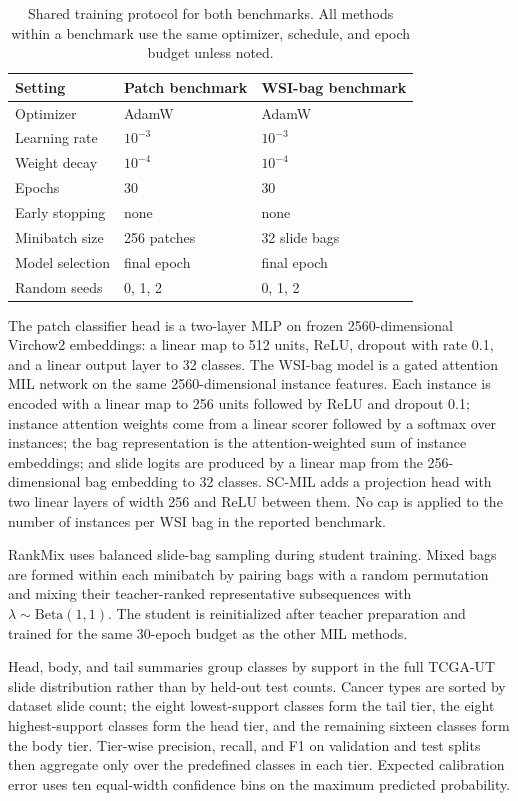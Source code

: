 \documentclass[11pt]{article}
\begin{document}
\begin{table}[ht]
  \centering
  \caption{Shared training protocol for both benchmarks. All methods within a benchmark use the same optimizer, schedule, and epoch budget unless noted.}
  \label{tab:training-protocol}
  \small
  \begin{tabular}{lll}
    \toprule
    Setting & Patch benchmark & WSI-bag benchmark\\
    \midrule
    Optimizer & AdamW & AdamW\\
    Learning rate & $10^{-3}$ & $10^{-3}$\\
    Weight decay & $10^{-4}$ & $10^{-4}$\\
    Epochs & 30 & 30\\
    Early stopping & none & none\\
    Minibatch size & 256 patches & 32 slide bags\\
    Model selection & final epoch & final epoch\\
    Random seeds & 0, 1, 2 & 0, 1, 2\\
    \bottomrule
  \end{tabular}
\end{table}

The patch classifier head is a two-layer MLP on frozen 2560-dimensional Virchow2 embeddings: a linear map to 512 units, ReLU, dropout with rate 0.1, and a linear output layer to 32 classes. The WSI-bag model is a gated attention MIL network on the same 2560-dimensional instance features. Each instance is encoded with a linear map to 256 units followed by ReLU and dropout 0.1; instance attention weights come from a linear scorer followed by a softmax over instances; the bag representation is the attention-weighted sum of instance embeddings; and slide logits are produced by a linear map from the 256-dimensional bag embedding to 32 classes. SC-MIL adds a projection head with two linear layers of width 256 and ReLU between them. No cap is applied to the number of instances per WSI bag in the reported benchmark.

RankMix uses balanced slide-bag sampling during student training. Mixed bags are formed within each minibatch by pairing bags with a random permutation and mixing their teacher-ranked representative subsequences with $\lambda\sim\mathrm{Beta}(1,1)$. The student is reinitialized after teacher preparation and trained for the same 30-epoch budget as the other MIL methods.

Head, body, and tail summaries group classes by support in the full TCGA-UT slide distribution rather than by held-out test counts. Cancer types are sorted by dataset slide count; the eight lowest-support classes form the tail tier, the eight highest-support classes form the head tier, and the remaining sixteen classes form the body tier. Tier-wise precision, recall, and F1 on validation and test splits then aggregate only over the predefined classes in each tier. Expected calibration error uses ten equal-width confidence bins on the maximum predicted probability.
\end{document}
